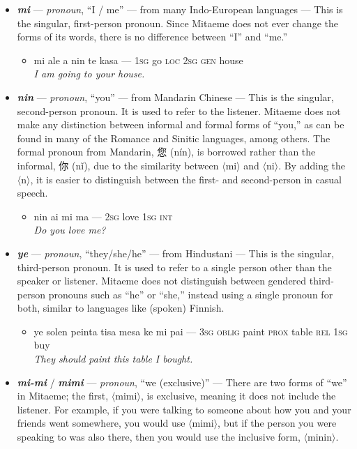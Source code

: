 \documentclass[a4paper]{article}
\begin{document}
\begin{itemize}
	\item \textbf{\textit{mi}} — \textit{pronoun}, ``I / me'' — from many Indo-European languages — This is the singular, first-person pronoun. Since Mitaeme does not ever change the forms of its words, there is no difference between ``I'' and ``me.''
	\begin{itemize}
		\item mi ale a nin te kasa — \textsc{1sg} go \textsc{loc 2sg gen} house \\\textit{I am going to your house.}
	\end{itemize}
	\item \textbf{\textit{nin}} — \textit{pronoun}, ``you'' — from Mandarin Chinese — This is the singular, second-person pronoun. It is used to refer to the listener. Mitaeme does not make any distinction between informal and formal forms of ``you,'' as can be found in many of the Romance and Sinitic languages, among others. The formal pronoun from Mandarin, 您 (nín), is borrowed rather than the informal, 你 (nǐ), due to the similarity between $\langle$mi$\rangle$ and $\langle$ni$\rangle$. By adding the $\langle$n$\rangle$, it is easier to distinguish between the first- and second-person in casual speech.
	\begin{itemize}
		\item nin ai mi ma — \textsc{2sg} love \textsc{1sg int} \\\textit{Do you love me?}
	\end{itemize}
	\item \textbf{\textit{ye}} — \textit{pronoun}, ``they/she/he'' — from Hindustani — This is the singular, third-person pronoun. It is used to refer to a single person other than the speaker or listener. Mitaeme does not distinguish between gendered third-person pronouns such as ``he'' or ``she,'' instead using a single pronoun for both, similar to languages like (spoken) Finnish.
	\begin{itemize}
		\item ye solen peinta tisa mesa ke mi pai — \textsc{3sg oblig} paint \textsc{prox} table \textsc{rel 1sg} buy \\\textit{They should paint this table I bought.}
	\end{itemize}
	\item \textbf{\textit{mi-mi}} / \textbf{\textit{mimi}} — \textit{pronoun}, ``we (exclusive)'' — There are two forms of ``we'' in Mitaeme; the first, $\langle$mimi$\rangle$, is exclusive, meaning it does not include the listener. For example, if you were talking to someone about how you and your friends went somewhere, you would use $\langle$mimi$\rangle$, but if the person you were speaking to was also there, then you would use the inclusive form, $\langle$minin$\rangle$.

\end{itemize}
\end{document}

